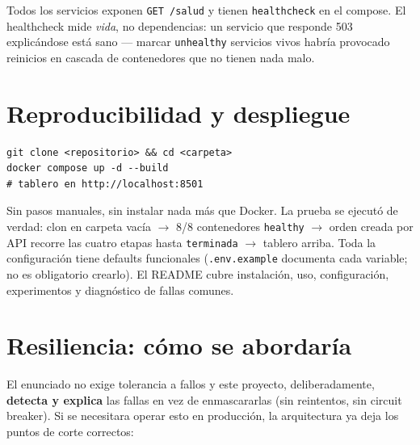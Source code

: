 \documentclass[12pt,a4paper]{article}
\begin{document}
Todos los servicios exponen \texttt{GET /salud} y tienen \texttt{healthcheck}
en el compose. El healthcheck mide \emph{vida}, no dependencias: un servicio
que responde 503 explicándose está sano — marcar \texttt{unhealthy} servicios
vivos habría provocado reinicios en cascada de contenedores que no tienen nada
malo.

\section{Reproducibilidad y despliegue}

\begin{lstlisting}
git clone <repositorio> && cd <carpeta>
docker compose up -d --build
# tablero en http://localhost:8501
\end{lstlisting}

Sin pasos manuales, sin instalar nada más que Docker. La prueba se ejecutó
de verdad: clon en carpeta vacía $\to$ 8/8 contenedores \texttt{healthy} $\to$
orden creada por API recorre las cuatro etapas hasta \texttt{terminada} $\to$
tablero arriba. Toda la configuración tiene defaults funcionales
(\texttt{.env.example} documenta cada variable; no es obligatorio crearlo).
El README cubre instalación, uso, configuración, experimentos y diagnóstico de
fallas comunes.

\section{Resiliencia: cómo se abordaría}
\label{sec:resiliencia}

El enunciado no exige tolerancia a fallos y este proyecto, deliberadamente,
\textbf{detecta y explica} las fallas en vez de enmascararlas (sin reintentos,
sin circuit breaker). Si se necesitara operar esto en producción, la
arquitectura ya deja los puntos de corte correctos:
\end{document}
